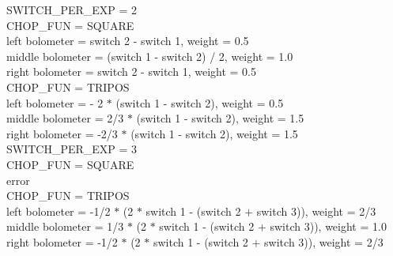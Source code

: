 {{      SWITCH\_PER\_EXP = 2\\
         CHOP\_FUN = SQUARE\\
            left bolometer = switch 2 - switch 1, weight = 0.5\\
          middle bolometer = (switch 1 - switch 2) / 2, weight = 1.0\\
           right bolometer = switch 2 - switch 1, weight = 0.5\\
         CHOP\_FUN = TRIPOS\\
            left bolometer = - 2 $*$ (switch 1 - switch 2), weight = 0.5\\
          middle bolometer = 2/3 $*$ (switch 1 - switch 2), weight = 1.5\\
           right bolometer = -2/3 $*$ (switch 1 - switch 2), weight = 1.5\\

      SWITCH\_PER\_EXP = 3\\
         CHOP\_FUN = SQUARE\\
            error\\
         CHOP\_FUN = TRIPOS\\
            left bolometer = -1/2 $*$ (2 $*$ switch 1 - (switch 2 $+$ switch 3)),
                             weight = 2/3\\
          middle bolometer = 1/3 $*$ (2 $*$ switch 1 - (switch 2 $+$ switch 3)),
                             weight = 1.0\\
           right bolometer = -1/2 $*$ (2 $*$ switch 1 - (switch 2 $+$ switch 3)),
                             weight = 2/3

}}
